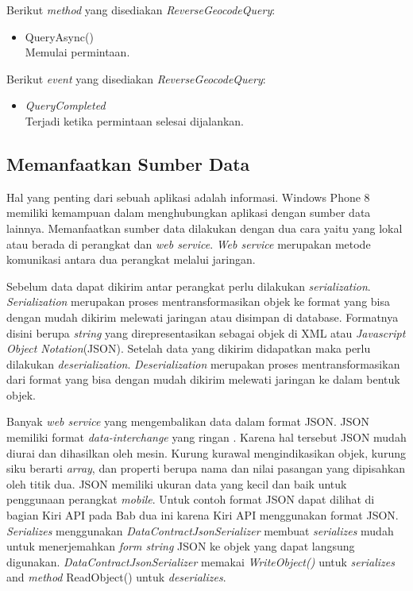 \begin{itemize}
			Berikut \textit{method} yang disediakan \textit{ReverseGeocodeQuery}:
			\begin{itemize}
				\item QueryAsync() \\
					Memulai permintaan.
			\end{itemize}

			Berikut \textit{event} yang disediakan \textit{ReverseGeocodeQuery}:
			\begin{itemize}
				\item \textit{QueryCompleted} \\
					Terjadi ketika permintaan selesai dijalankan.
			\end{itemize}
\end{itemize}

\subsection{Memanfaatkan Sumber Data \cite{Manning}}
\label{subsec:Memanfaatkan Sumber Data}
\hspace{0.5cm} Hal yang penting dari sebuah aplikasi adalah informasi. Windows Phone 8 memiliki kemampuan dalam menghubungkan aplikasi dengan sumber data lainnya. Memanfaatkan sumber data dilakukan dengan dua cara yaitu yang lokal atau berada di perangkat dan \textit{web service}. \textit{Web service} merupakan metode komunikasi antara dua perangkat melalui jaringan. 

Sebelum data dapat dikirim antar perangkat perlu dilakukan \textit{serialization}. \textit{Serialization} merupakan proses mentransformasikan objek ke format yang bisa dengan mudah dikirim melewati jaringan atau disimpan di database\cite{Manning}. Formatnya disini berupa \textit{string} yang direpresentasikan sebagai objek di XML atau \textit{Javascript Object Notation}(JSON). Setelah data yang dikirim didapatkan maka perlu dilakukan \textit{deserialization}. \textit{Deserialization} merupakan proses mentransformasikan dari format yang bisa dengan mudah dikirim melewati jaringan ke dalam bentuk objek. 

Banyak \textit{web service} yang mengembalikan data dalam format JSON. JSON memiliki format \textit{data-interchange} yang ringan \cite{rfc7159}. Karena hal tersebut JSON mudah diurai dan dihasilkan oleh mesin. Kurung kurawal mengindikasikan objek, kurung siku berarti \textit{array}, dan properti berupa nama dan nilai pasangan yang dipisahkan oleh titik dua. JSON memiliki ukuran data yang kecil dan baik untuk penggunaan perangkat \textit{mobile}. Untuk contoh format JSON dapat dilihat di bagian Kiri API pada Bab dua ini karena Kiri API menggunakan format JSON. \textit{Serializes} menggunakan \textit{DataContractJsonSerializer} membuat \textit{serializes} mudah untuk menerjemahkan \textit{form string} JSON ke objek yang dapat langsung digunakan. \textit{DataContractJsonSerializer} memakai \textit{WriteObject()} untuk \textit{serializes} and \textit{method} ReadObject() untuk \textit{deserializes}.

